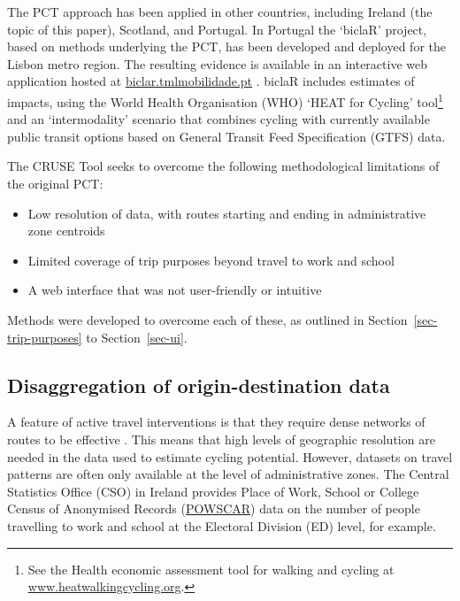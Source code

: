 \documentclass[
  super,
  preprint,
  3p]{elsarticle}
\providecommand{\tightlist}{%
  \setlength{\itemsep}{0pt}\setlength{\parskip}{0pt}}\usepackage{longtable,booktabs,array}
\begin{document}
The PCT approach has been applied in other countries, including Ireland
(the topic of this paper), Scotland, and Portugal. In Portugal the
`biclaR' project, based on methods underlying the PCT, has been
developed and deployed for the Lisbon metro region. The resulting
evidence is available in an interactive web application hosted at
\href{https://biclar.tmlmobilidade.pt}{biclar.tmlmobilidade.pt}
\citep{felix2023}. biclaR includes estimates of impacts, using the World
Health Organisation (WHO) `HEAT for Cycling' tool\footnote{See the
  Health economic assessment tool for walking and cycling at
  \href{https://www.heatwalkingcycling.org/\#homepage}{www.heatwalkingcycling.org}.}
and an `intermodality' scenario that combines cycling with currently
available public transit options based on General Transit Feed
Specification (GTFS) data.

The CRUSE Tool seeks to overcome the following methodological
limitations of the original PCT:

\begin{itemize}
\tightlist
\item
  Low resolution of data, with routes starting and ending in
  administrative zone centroids
\item
  Limited coverage of trip purposes beyond travel to work and school
\item
  A web interface that was not user-friendly or intuitive
\end{itemize}

Methods were developed to overcome each of these, as outlined in
Section~\ref{sec-trip-purposes} to Section~\ref{sec-ui}.

\hypertarget{sec-disaggregation}{%
\subsection{Disaggregation of origin-destination
data}\label{sec-disaggregation}}

A feature of active travel interventions is that they require dense
networks of routes to be effective \citep{parkin2018}. This means that
high levels of geographic resolution are needed in the data used to
estimate cycling potential. However, datasets on travel patterns are
often only available at the level of administrative zones. The Central
Statistics Office (CSO) in Ireland provides Place of Work, School or
College Census of Anonymised Records
(\href{https://www.cso.ie/en/census/census2016reports/powscar/}{POWSCAR})
data on the number of people travelling to work and school at the
Electoral Division (ED) level, for example.
\end{document}
